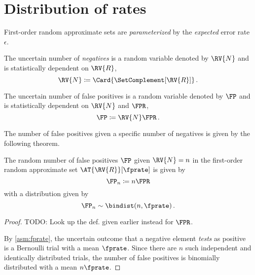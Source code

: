 \documentclass[ ../main.tex]{subfiles}
\begin{document}
\section{Distribution of rates}
\label{sec:characteristics}
First-order random approximate sets are \emph{parameterized} by the \emph{expected} error rate $\epsilon$.
\begin{definition}
The uncertain number of \emph{negatives} is a random variable denoted by $\RV{N}$ and is statistically dependent on $\RV{R}$,
\begin{equation}
\RV{N} \coloneqq \Card{\SetComplement[\RV{R}]}\,.
\end{equation}
\end{definition}

\begin{definition}
The uncertain number of false positives is a random variable denoted by $\FP$ and is statistically dependent on $\RV{N}$ and $\FPR$,
\begin{equation}
	\FP \coloneqq \RV{N} \FPR\,.
\end{equation}
\end{definition}

The number of false positives given a specific number of negatives is given by the following theorem.
\begin{theorem}
\label{thm:fpbinom}
The random number of false positives $\FP$ given $\RV{N} = n$ in the first-order random approximate set $\AT{\RV{R}}[\fprate]$ is given by
\begin{equation}
	\FP_n \coloneqq n \FPR
\end{equation}
with a distribution given by
\begin{equation}
    \FP_n \sim \bindist(n, \fprate)\,.
\end{equation}
\end{theorem}
\begin{proof}
TODO: Look up the def. given earlier instead for $\FPR$.

By \cref{asm:fprate}, the uncertain outcome that a negative element \emph{tests} as positive is a Bernoulli trial with a mean $\fprate$.
Since there are $n$ such independent and identically distributed trials, the number of false positives is binomially distributed with a mean $n \fprate$.
\end{proof}
\end{document}
